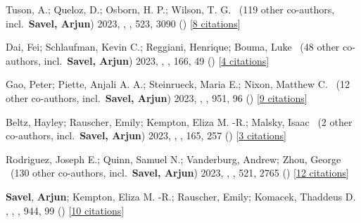 \item[{\color{numcolor}\scriptsize25}] Tuson, A.; Queloz, D.; Osborn, H. P.; Wilson, T. G. \etal\ ({119} other co-authors, incl.\ \textbf{Savel, Arjun}) 2023, , \mnras, {523}, 3090 () [\href{https://ui.adsabs.harvard.edu/abs/2023MNRAS.523.3090T}{8 citations}]

\item[{\color{numcolor}\scriptsize24}] Dai, Fei; Schlaufman, Kevin C.; Reggiani, Henrique; Bouma, Luke \etal\ ({48} other co-authors, incl.\ \textbf{Savel, Arjun}) 2023, , \aj, {166}, 49 () [\href{https://ui.adsabs.harvard.edu/abs/2023AJ....166...49D}{4 citations}]

\item[{\color{numcolor}\scriptsize23}] Gao, Peter; Piette, Anjali A. A.; Steinrueck, Maria E.; Nixon, Matthew C. \etal\ ({12} other co-authors, incl.\ \textbf{Savel, Arjun}) 2023, , \apj, {951}, 96 () [\href{https://ui.adsabs.harvard.edu/abs/2023ApJ...951...96G}{9 citations}]

\item[{\color{numcolor}\scriptsize22}] Beltz, Hayley; Rauscher, Emily; Kempton, Eliza M. -R.; Malsky, Isaac \etal\ ({2} other co-authors, incl.\ \textbf{Savel, Arjun}) 2023, , \aj, {165}, 257 () [\href{https://ui.adsabs.harvard.edu/abs/2023AJ....165..257B}{3 citations}]

\item[{\color{numcolor}\scriptsize21}] Rodriguez, Joseph E.; Quinn, Samuel N.; Vanderburg, Andrew; Zhou, George \etal\ ({130} other co-authors, incl.\ \textbf{Savel, Arjun}) 2023, , \mnras, {521}, 2765 () [\href{https://ui.adsabs.harvard.edu/abs/2023MNRAS.521.2765R}{12 citations}]

\item[{\color{numcolor}\scriptsize20}] \textbf{Savel}, \textbf{Arjun}; Kempton, Eliza M. -R.; Rauscher, Emily; Komacek, Thaddeus D. , , \apj, {944}, 99 () [\href{https://ui.adsabs.harvard.edu/abs/2023ApJ...944...99S}{10 citations}]

